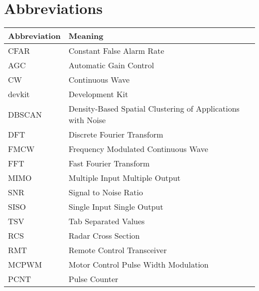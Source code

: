 
\chapter*{Abbreviations}


\begin{center}
  \begin{tabular}{| m{4cm}| m{9cm} | }
    \hline
		\textbf{Abbreviation} & \textbf{Meaning} \\
    \hline
    \hline
		CFAR & Constant False Alarm Rate \\
		AGC & Automatic Gain Control \\
		CW & Continuous Wave \\
		devkit & Development Kit \\
		DBSCAN & Density-Based Spatial Clustering of Applications with Noise \\
		DFT & Discrete Fourier Transform \\
		FMCW & Frequency Modulated Continuous Wave \\
		FFT & Fast Fourier Transform \\
		MIMO & Multiple Input Multiple Output \\
		SNR & Signal to Noise Ratio \\
		SISO & Single Input Single Output \\
		TSV & Tab Separated Values \\
		RCS & Radar Cross Section \\
		RMT & Remote Control Transceiver \\
		MCPWM & Motor Control Pulse Width Modulation \\
		PCNT & Pulse Counter \\
    \hline
  \end{tabular}

\end{center}
